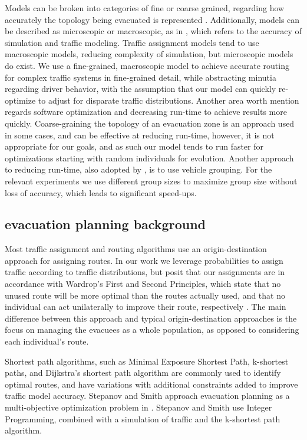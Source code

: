\documentclass{sig-alternate-05-2015}
\begin{document}
	Models can be broken into categories of fine or coarse grained, regarding how accurately the topology being evacuated is represented \cite{gwynne1999review}. Additionally, models can be described as microscopic or macroscopic, as in \cite{bazzan2014evolutionary}, which refers to the accuracy of simulation and traffic modeling. Traffic assignment models tend to use macroscopic models, reducing complexity of simulation, but microscopic models do exist. We use a fine-grained, macroscopic model to achieve accurate routing for complex traffic systems in fine-grained detail, while abstracting minutia regarding driver behavior, with the assumption that our model can quickly re-optimize to adjust for disparate traffic distributions.
	Another area worth mention regards software optimization and decreasing run-time to achieve results more quickly. Coarse-graining the topology of an evacuation zone is an approach used in some cases, and can be effective at reducing run-time, however, it is not appropriate for our goals, and as such our model tends to run faster for optimizations starting with random individuals for evolution. Another approach to reducing run-time, also adopted by \cite{bazzan2014evolutionary}, is to use vehicle grouping. For the relevant experiments we use different group sizes to maximize group size without loss of accuracy, which leads to significant speed-ups. 
	
	\subsection{evacuation planning background}
	Most traffic assignment and routing algorithms use an origin-destination approach for assigning routes. In our work we leverage probabilities to assign traffic according to traffic distributions, but posit that our assignments are in accordance with Wardrop's First and Second Principles, which state that no unused route will be more optimal than the routes actually used, and that no individual can act unilaterally to improve their route, respectively \cite{wardrop1952road}. The main difference between this approach and typical origin-destination approaches is the focus on managing the evacuees as a whole population, as opposed to considering each individual's route.
	
	Shortest path algorithms, such as Minimal Exposure Shortest Path\cite{chiu2004traffic}, k-shortest paths, and Dijkstra's shortest path algorithm are commonly used to identify optimal routes, and have variations with additional constraints added to improve traffic model accuracy.	Stepanov and Smith approach evacuation planning as a multi-objective optimization problem in \cite{stepanov2009multi}. Stepanov and Smith use Integer Programming, combined with a simulation of traffic and the k-shortest path algorithm. 
	
\end{document}
